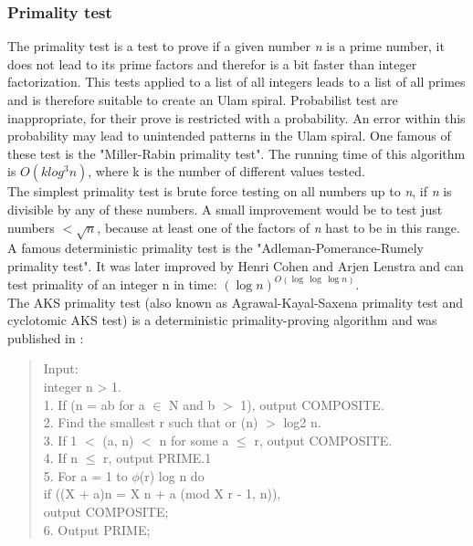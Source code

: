\subsubsection{Primality test}
\label{sec:primality_test}
The primality test is a test to prove if a given number \emph{n} is a prime number, it does not lead to its prime factors and therefor is a bit faster than integer factorization. This tests applied to a list of all integers leads to a list of all primes and is therefore suitable to create an Ulam spiral. Probabilist test are inappropriate, for their prove is restricted with a probability. An error within this probability may lead to unintended patterns in the Ulam spiral. One famous of these test is the "Miller-Rabin primality test". The running time of this algorithm is $O(k log^{3} n)$, where k is the number of different values tested.\\
The simplest primality test is brute force testing on all numbers up to \emph{n}, if \emph{n} is divisible by any of these numbers. A small improvement would be to  test just numbers $< \sqrt{n}$, because at least one of the factors of \emph{n} hast to be in this range.\\
A famous deterministic primality test is the "Adleman-Pomerance-Rumely primality test". It was later improved by Henri Cohen and Arjen Lenstra and can test primality of an integer n in time:
    $(\log n)^{O(\log\,\log \,\log n)}$. 
\\
The AKS primality test (also known as Agrawal-Kayal-Saxena primality test and cyclotomic AKS test) is a deterministic primality-proving algorithm and was published in \cite{primeinp}:

\begin{quote}
Input:\\
\noindent\hspace*{12mm} integer n > 1.\\
1. If (n = ab for a $\in$ N and b $>$ 1), output COMPOSITE.\\
2. Find the smallest r such that or (n) $>$ log2 n.\\
3. If 1 $<$ (a, n) $<$ n for some a $\leq$ r, output COMPOSITE.\\
4. If n $\leq$ r, output PRIME.1\\
5. For a = 1 to $\phi$(r) log n do\\
   \noindent\hspace*{12mm} if ((X + a)n = X n + a (mod X r - 1, n)),\\
   \noindent\hspace*{24mm}output COMPOSITE;\\
6. Output PRIME;
\end{quote}


